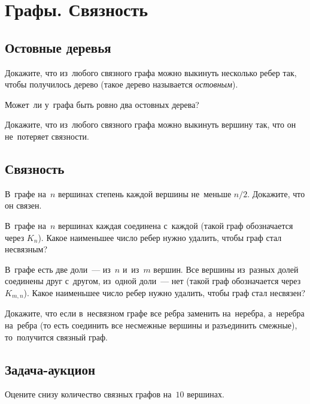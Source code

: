 
\section*{Графы. Связность}



\subsection*{Остовные деревья}

\begin{problems}

\item
Докажите, что из~любого связного графа можно выкинуть несколько ребер так,
чтобы получилось дерево (такое дерево называется \emph{остовным}).

\item
Может~ли у~графа быть ровно два остовных дерева?

\item
Докажите, что из~любого связного графа можно выкинуть вершину так, что он
не~потеряет связности.

\end{problems}


\subsection*{Связность}

\begin{problems}

\item
В~графе на~$n$ вершинах степень каждой вершины не~меньше $n / 2$.
Докажите, что он связен.

\item
В~графе на~$n$ вершинах каждая соединена с~каждой (такой граф обозначается
через $K_n$).
Какое наименьшее число ребер нужно удалить, чтобы граф стал несвязным?

\item
В~графе есть две доли~--- из~$n$ и~из~$m$ вершин.
Все вершины из~разных долей соединены друг с~другом, из~одной доли~--- нет
(такой граф обозначается через $K_{m,n}$).
Какое наименьшее число ребер нужно удалить, чтобы граф стал несвязен?

\item
Докажите, что если в~несвязном графе все ребра заменить на~неребра, а~неребра
на~ребра (то есть соединить все несмежные вершины и разъединить смежные),
то~получится связный граф.

\end{problems}


\subsection*{Задача-аукцион}

\begin{problems}

\item
Оцените снизу количество связных графов на~$10$ вершинах.

\end{problems}

